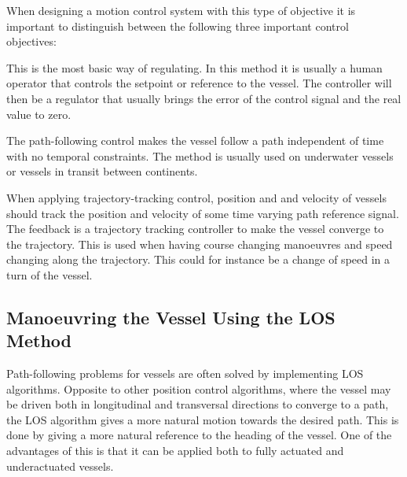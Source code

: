 When designing a motion control system with this type of objective it is important to distinguish between the following three important control objectives:
\begin{description}[style=nextline]
	\item [Setpoint regulation]
	This is the most basic way of regulating. In this method it is usually a human operator that controls the setpoint or reference to the vessel. The controller will then be a regulator that usually brings the error of the control signal and the real value to zero.
	\item [Path-following control]
	The path-following control makes the vessel follow a path independent of time with no temporal constraints. The method is usually used on underwater vessels or vessels in transit between continents.
	\item [Trajectory-tracking control]
	When applying trajectory-tracking control, position and and velocity of vessels should track the position and velocity of some time varying path reference signal. The feedback is a trajectory tracking controller to make the vessel converge to the trajectory. This is used when having course changing manoeuvres and speed changing along the trajectory. This could for instance be a change of speed in a turn of the vessel.
\end{description}

\subsection{Manoeuvring the Vessel Using the LOS Method}
Path-following problems for vessels are often solved by implementing \ac{LOS} algorithms. Opposite to other position control algorithms, where the vessel may be driven both in longitudinal and transversal directions to converge to a path, the \ac{LOS} algorithm gives a more natural motion towards the desired path. This is done by giving a more natural reference to the heading of the vessel. One of the advantages of this is that it can be applied both to fully actuated and underactuated vessels.

